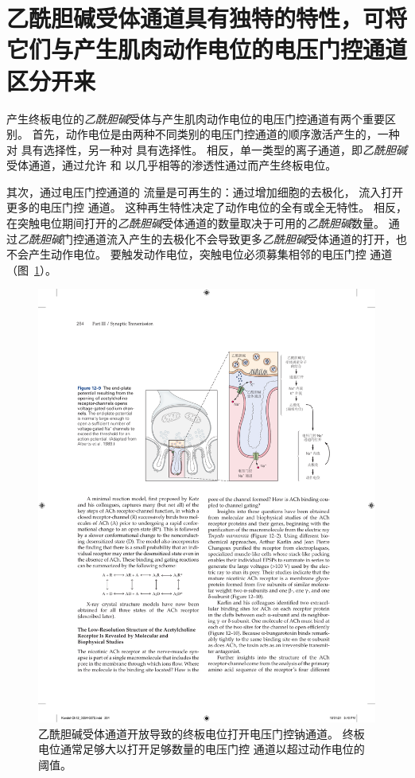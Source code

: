 \section{乙酰胆碱受体通道具有独特的特性，可将它们与产生肌肉动作电位的电压门控通道区分开来}

产生终板电位的\textit{乙酰胆碱}受体与产生肌肉动作电位的电压门控通道有两个重要区别。
首先，动作电位是由两种不同类别的电压门控通道的顺序激活产生的，一种对  具有选择性，另一种对  具有选择性。
相反，单一类型的离子通道，即\textit{乙酰胆碱}受体通道，通过允许  和  以几乎相等的渗透性通过而产生终板电位。


其次，通过电压门控通道的  流量是可再生的：通过增加细胞的去极化， 流入打开更多的电压门控  通道。
这种再生特性决定了动作电位的全有或全无特性。
相反，在突触电位期间打开的\textit{乙酰胆碱}受体通道的数量取决于可用的\textit{乙酰胆碱}数量。
 通过\textit{乙酰胆碱}门控通道流入产生的去极化不会导致更多\textit{乙酰胆碱}受体通道的打开，也不会产生动作电位。
要触发动作电位，突触电位必须募集相邻的电压门控  通道（图~\ref{fig:12_9}）。


\begin{figure}[htbp]
	\centering
	\includegraphics[width=0.9\linewidth]{chap12/fig_12_9}
	\caption{乙酰胆碱受体通道开放导致的终板电位打开电压门控钠通道。
		终板电位通常足够大以打开足够数量的电压门控  通道以超过动作电位的阈值\cite{alberts2017molecular}。}
	\label{fig:12_9}
\end{figure}


